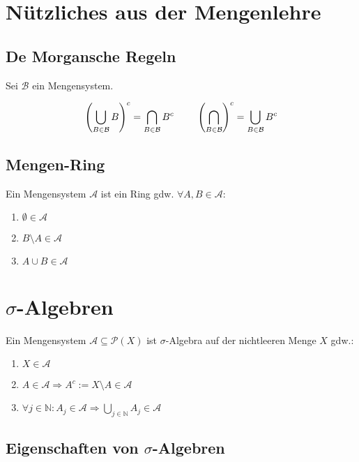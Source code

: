 \section*{Nützliches aus der Mengenlehre}

\subsection*{De Morgansche Regeln}

Sei $\mathcal{B}$ ein Mengensystem.

$$\left(\bigcup_{B\in \mathcal{B}} B \right)^c = \bigcap_{B\in \mathcal{B}} B^c \hspace*{8mm} \left(\bigcap_{B\in \mathcal{B}} \right)^c = \bigcup_{B\in \mathcal{B}} B^c$$

\subsection*{Mengen-Ring}

Ein Mengensystem $\mathcal{A}$ ist ein Ring gdw. $\forall A, B \in \mathcal{A}$:

\begin{enumerate}[label=(\alph*)]
	\item $\emptyset \in \mathcal{A}$
	\item $B\setminus A \in \mathcal{A}$
	\item $A \cup B \in \mathcal{A}$
\end{enumerate}

\section*{$\sigma$-Algebren}

Ein Mengensystem $\mathcal{A} \subseteq \mathcal{P}(X)$ ist $\sigma$-Algebra auf der nichtleeren Menge $X$ gdw.:

\begin{enumerate}[label=(\alph*)]
	\item $X \in \mathcal{A}$
	\item $A \in \mathcal{A} \Rightarrow A^c := X\setminus A \in \mathcal{A}$
	\item $\forall j \in \mathbb{N} : A_j \in \mathcal{A} \Rightarrow \bigcup_{j\in \mathbb{N}} A_j \in \mathcal{A}$
\end{enumerate}

\subsection*{Eigenschaften von $\sigma$-Algebren}

